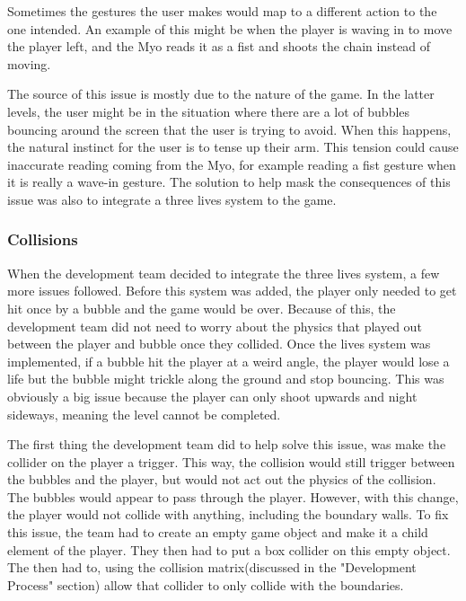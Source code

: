 \documentclass{article}
\begin{document}
Sometimes the gestures the user makes would map to a different action to the one intended. An example of this might be when the player is waving in to move the player left, and the Myo reads it as a fist and shoots the chain instead of moving. 

\bigskip

The source of this issue is mostly due to the nature of the game. In the latter levels, the user might be in the situation where there are a lot of bubbles bouncing around the screen that the user is trying to avoid. When this happens, the natural instinct for the user is to tense up their arm. This tension could cause inaccurate reading coming from the Myo, for example reading a fist gesture when it is really a wave-in gesture. 
The solution to help mask the consequences of this issue was also to integrate a three lives system to the game.

\subsubsection{Collisions}

When the development team decided to integrate the three lives system, a few more issues followed. Before this system was added, the player only needed to get hit once by a bubble and the game would be over. Because of this, the development team did not need to worry about the physics that played out between the player and bubble once they collided. Once the lives system was implemented, if a bubble hit the player at a weird angle, the player would lose a life but the bubble might trickle along the ground and stop bouncing. This was obviously a big issue because the player can only shoot upwards and night sideways, meaning the level cannot be completed.

\bigskip

The first thing the development team did to help solve this issue, was make the collider on the player a trigger. This way, the collision would still trigger between the bubbles and the player, but would not act out the physics of the collision. The bubbles would appear to pass through the player. However, with this change, the player would not collide with anything, including the boundary walls. To fix this issue, the team had to create an empty game object and make it a child element of the player. They then had to put a box collider on this empty object. The then had to, using the collision matrix(discussed in the "Development Process" section) allow that collider to only collide with the boundaries.
\end{document}
